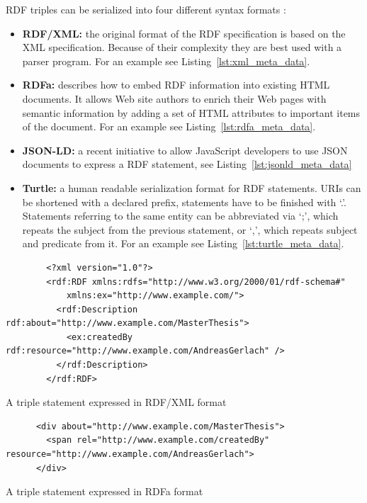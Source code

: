 \gls{RDF} triples can be serialized into four different syntax formats \citep[pg. 43-54]{wood2014linked}: \@

\begin{itemize}

	\item \textbf{\gls{RDF}/\gls{XML}:} the original format of the \gls{RDF} specification is based on the \gls{XML} specification. Because of their complexity they are best used with a parser program. For an example see Listing~\ref{lst:xml_meta_data}.
	\item \textbf{\gls{RDFa}:} describes how to embed \gls{RDF} information into existing \gls{HTML} documents. It allows Web site authors to enrich their Web pages with semantic information by adding a set of \gls{HTML} attributes to important items of the document. For an example see Listing~\ref{lst:rdfa_meta_data}.
	\item \textbf{\gls{JSON-LD}:} a recent initiative to allow JavaScript developers to use \gls{JSON} documents to express a \gls{RDF} statement, see Listing~\ref{lst:jsonld_meta_data}
	\item \textbf{Turtle:} a human readable serialization format for \gls{RDF} statements. \gls{URI}s can be shortened with a declared prefix, statements have to be finished with `.'. Statements referring to the same entity can be abbreviated via `;', which repeats the subject from the previous statement, or `,', which repeats subject and predicate from it. For an example see Listing~\ref{lst:turtle_meta_data}.
\end{itemize}

\begin{listing}[H]
	\begin{verbatim}
		<?xml version="1.0"?>
		<rdf:RDF xmlns:rdfs="http://www.w3.org/2000/01/rdf-schema#"
			xmlns:ex="http://www.example.com/">
		  <rdf:Description rdf:about="http://www.example.com/MasterThesis">
		    <ex:createdBy rdf:resource="http://www.example.com/AndreasGerlach" />
		  </rdf:Description>
		</rdf:RDF>
	\end{verbatim}
\caption{A triple statement expressed in \gls{RDF}/\gls{XML} format}
\label{lst:xml_meta_data}
\end{listing}

\begin{listing}[H]
	\begin{verbatim}
	  <div about="http://www.example.com/MasterThesis">
	    <span rel="http://www.example.com/createdBy" resource="http://www.example.com/AndreasGerlach">
	  </div>
	\end{verbatim}
\caption{A triple statement expressed in \gls{RDFa} format}
\label{lst:rdfa_meta_data}
\end{listing}

